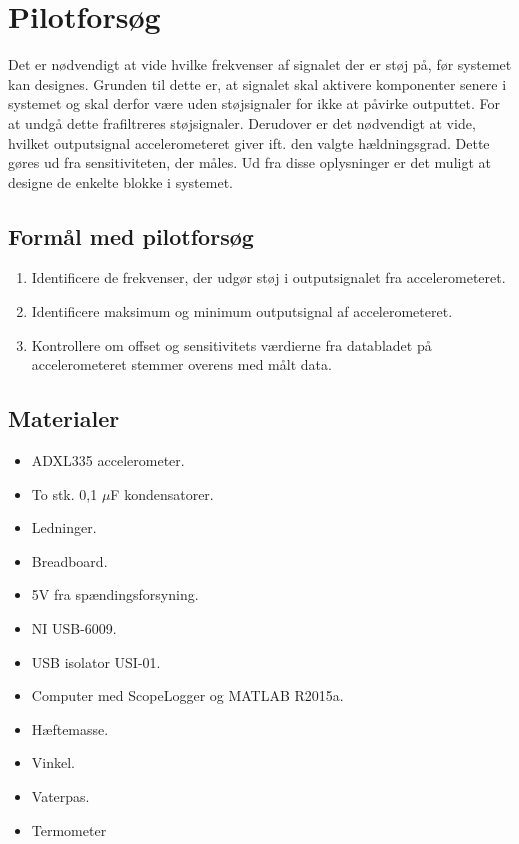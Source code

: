 \section{Pilotforsøg}\label{Sec:Pilotforsoeg}
Det er nødvendigt at vide hvilke frekvenser af signalet der er støj på, før systemet kan designes. Grunden til dette er, at signalet skal aktivere komponenter senere i systemet og skal derfor være uden støjsignaler for ikke at påvirke outputtet. For at undgå dette frafiltreres støjsignaler. Derudover er det nødvendigt at vide, hvilket outputsignal accelerometeret giver ift. den valgte hældningsgrad. Dette gøres ud fra sensitiviteten, der måles. Ud fra disse oplysninger er det muligt at designe de enkelte blokke i systemet.%

\subsection{Formål med pilotforsøg}
\begin{enumerate}
\item Identificere de frekvenser, der udgør støj i outputsignalet fra accelerometeret.
\item Identificere maksimum og minimum outputsignal af accelerometeret.
\item Kontrollere om offset og sensitivitets værdierne fra databladet på accelerometeret stemmer overens med målt data.
\end{enumerate}

\subsection{Materialer}
\begin{itemize}
\item ADXL335 accelerometer.
\item To stk. 0,1 $\mu$F kondensatorer.
\item Ledninger.
\item Breadboard.
\item 5V fra spændingsforsyning.
\item NI USB-6009.
\item USB isolator USI-01.
\item Computer med ScopeLogger og MATLAB R2015a.
\item Hæftemasse.
\item Vinkel.
\item Vaterpas.
\item Termometer
\end{itemize}

